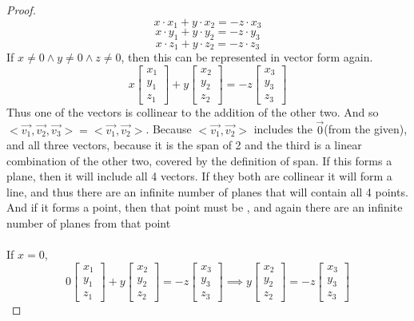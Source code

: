 \documentclass[12pt]{article}   %
\begin{document}
\begin{proof}
\[x\cdot x_1+y\cdot x_2= -z\cdot x_3\]
\[x\cdot y_1+y\cdot y_2= -z\cdot y_3\]
\[x\cdot z_1+y\cdot z_2= -z \cdot z_3\]
If $x\neq 0\land y \neq 0 \land z\neq 0$, then this can be represented in vector form again.
\[x\begin{bmatrix}x_1\\y_1\\z_1\end{bmatrix}+
y\begin{bmatrix}x_2\\y_2\\z_2\end{bmatrix}=
-z\begin{bmatrix}x_3\\y_3\\z_3\end{bmatrix}\]
Thus one of the vectors is collinear to the addition of the other two. And so $<\Vec{v_1},\Vec{v_2},\Vec{v_3}>=<\Vec{v_1},\Vec{v_2}>$. Because $<\Vec{v_1},\Vec{v_2}>$ includes the $\Vec{0}$(from the given), and all three vectors, because it is the span of 2 and the third is a linear combination of the other two, covered by the definition of span. If this forms a plane, then it will include all 4 vectors. If they both are collinear it will form a line, and thus there are an infinite number of planes that will contain all 4 points. And if it forms a point, then that point must be , and again there are an infinite number of planes from that point\\\\
If $x=0$,
\[0\begin{bmatrix}x_1\\y_1\\z_1\end{bmatrix}+
y\begin{bmatrix}x_2\\y_2\\z_2\end{bmatrix}=
-z\begin{bmatrix}x_3\\y_3\\z_3\end{bmatrix}\implies y\begin{bmatrix}x_2\\y_2\\z_2\end{bmatrix}=
-z\begin{bmatrix}x_3\\y_3\\z_3\end{bmatrix}\]

\end{proof}
\end{document}
